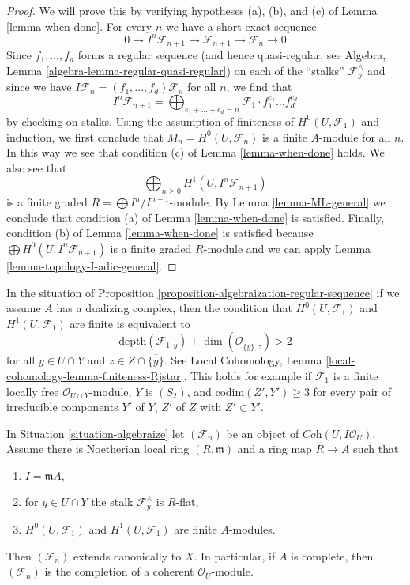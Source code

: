 \begin{proof}
We will prove this by verifying hypotheses (a), (b), and (c) of
Lemma \ref{lemma-when-done}.
For every $n$ we have a short exact sequence
$$
0 \to I^n\mathcal{F}_{n + 1} \to \mathcal{F}_{n + 1} \to \mathcal{F}_n \to 0
$$
Since $f_1, \ldots, f_d$ forms a regular sequence (and hence
quasi-regular, see Algebra, Lemma \ref{algebra-lemma-regular-quasi-regular})
on each of the ``stalks'' $\mathcal{F}_y^\wedge$ and since we have
$I\mathcal{F}_n = (f_1, \ldots, f_d)\mathcal{F}_n$ for all $n$,
we find that
$$
I^n\mathcal{F}_{n + 1} =
\bigoplus\nolimits_{e_1 + \ldots + e_d = n} \mathcal{F}_1 \cdot
f_1^{e_1} \ldots f_d^{e_d}
$$
by checking on stalks. Using the assumption of finiteness of
$H^0(U, \mathcal{F}_1)$ and induction, we first conclude that
$M_n = H^0(U, \mathcal{F}_n)$ is a finite $A$-module for all $n$.
In this way we see that condition (c) of Lemma \ref{lemma-when-done} holds.
We also see that
$$
\bigoplus\nolimits_{n \geq 0} H^1(U, I^n\mathcal{F}_{n + 1})
$$
is a finite graded $R = \bigoplus I^n/I^{n +1}$-module.
By Lemma \ref{lemma-ML-general} we conclude that condition (a) of
Lemma \ref{lemma-when-done} is satisfied. Finally, condition (b) of
Lemma \ref{lemma-when-done} is satisfied because
$\bigoplus H^0(U, I^n\mathcal{F}_{n + 1})$ is a finite graded $R$-module
and we can apply Lemma \ref{lemma-topology-I-adic-general}.
\end{proof}

\begin{remark}
\label{remark-interesting-case-ter}
In the situation of
Proposition \ref{proposition-algebraization-regular-sequence}
if we assume $A$ has a dualizing complex, then
the condition that $H^0(U, \mathcal{F}_1)$ and
$H^1(U, \mathcal{F}_1)$ are finite is equivalent to
$$
\text{depth}(\mathcal{F}_{1, y}) +
\dim(\mathcal{O}_{\overline{\{y\}}, z}) > 2
$$
for all $y \in U \cap Y$ and $z \in Z \cap \overline{\{y\}}$.
See Local Cohomology, Lemma \ref{local-cohomology-lemma-finiteness-Rjstar}.
This holds for example if $\mathcal{F}_1$ is a finite locally free
$\mathcal{O}_{U \cap Y}$-module, $Y$ is $(S_2)$, and
$\text{codim}(Z', Y') \geq 3$ for every pair of irreducible components
$Y'$ of $Y$, $Z'$ of $Z$ with $Z' \subset Y'$.
\end{remark}

\begin{proposition}
\label{proposition-algebraization-flat}
In Situation \ref{situation-algebraize} let
$(\mathcal{F}_n)$ be an object of $\textit{Coh}(U, I\mathcal{O}_U)$.
Assume there is Noetherian local ring $(R, \mathfrak m)$ and a ring
map $R \to A$ such that
\begin{enumerate}
\item $I = \mathfrak m A$,
\item for $y \in U \cap Y$ the stalk $\mathcal{F}_y^\wedge$ is $R$-flat,
\item $H^0(U, \mathcal{F}_1)$ and $H^1(U, \mathcal{F}_1)$ are finite
$A$-modules.
\end{enumerate}
Then $(\mathcal{F}_n)$ extends canonically to $X$. In particular, if $A$
is complete, then $(\mathcal{F}_n)$ is the completion of a coherent
$\mathcal{O}_U$-module.
\end{proposition}

